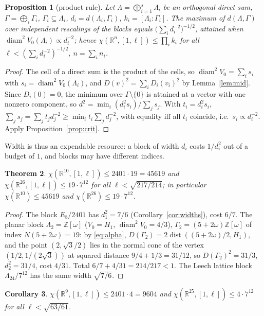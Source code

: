 \documentclass[10pt]{article}
\theoremstyle{plain}
\newtheorem{theorem}{Theorem}[section]
\newtheorem{proposition}[theorem]{Proposition}
\newtheorem{corollary}[theorem]{Corollary}
\theoremstyle{remark}
\newcommand{\R}{\mathbb{R}}
\newcommand{\Z}{\mathbb{Z}}
\newcommand{\diam}{\operatorname{diam}}
\newcommand{\dist}{\operatorname{dist}}
\begin{document}
\begin{proposition}[product rule]\label{prop:product}
Let $\Lambda=\bigoplus_{i=1}^{s}\Lambda_i$ be an orthogonal direct sum,
$\Gamma=\bigoplus_i\Gamma_i$, $\Gamma_i\subseteq\Lambda_i$,
$d_i=d(\Lambda_i,\Gamma_i)$, $k_i=[\Lambda_i:\Gamma_i]$. The maximum of
$d(\Lambda,\Gamma)$ over independent rescalings of the blocks equals
$\bigl(\sum_id_i^{-2}\bigr)^{-1/2}$, attained when
$\diam^2V_0(\Lambda_i)\propto d_i^{-2}$; hence
$\chi(\R^n,[1,\ell])\le\prod_ik_i$ for all $\ell<(\sum_id_i^{-2})^{-1/2}$,
$n=\sum_in_i$.
\end{proposition}

\begin{proof}
The cell of a direct sum is the product of the cells, so
$\diam^2V_0=\sum_is_i$ with $s_i=\diam^2V_0(\Lambda_i)$, and
$D(v)^2=\sum_iD_i(v_i)^2$ by Lemma~\ref{lem:mid}. Since $D_i(0)=0$, the
minimum over $\Gamma\setminus\{0\}$ is attained at a vector with one nonzero
component, so $d^2=\min_i(d_i^2s_i)/\sum_js_j$. With $t_i=d_i^2s_i$,
$\sum_js_j=\sum_jt_jd_j^{-2}\ge\min_it_i\sum_jd_j^{-2}$, with equality iff
all $t_i$ coincide, i.e.\ $s_i\propto d_i^{-2}$. Apply
Proposition~\ref{prop:crit}.
\end{proof}

Width is thus an expendable resource: a block of width $d_i$ costs
$1/d_i^2$ out of a budget of $1$, and blocks may have different indices.

\begin{theorem}\label{thm:45619}
$\chi(\R^{10},[1,\ell])\le2401\cdot19=45619$ and
$\chi(\R^{26},[1,\ell])\le19\cdot7^{12}$ for all $\ell<\sqrt{217/214}$; in
particular $\chi(\R^{10})\le45619$ and $\chi(\R^{26})\le19\cdot7^{12}$.
\end{theorem}

\begin{proof}
The block $E_8/2401$ has $d_1^2=7/6$ (Corollary~\ref{cor:widths}), cost
$6/7$. The planar block $\Lambda_2=\Z[\omega]$ ($V_0=H_1$, $\diam^2V_0=4/3$),
$\Gamma_2=(5+2\omega)\Z[\omega]$ of index $N(5+2\omega)=19$: by
\eqref{eq:alpha}, $D(\Gamma_2)=2\dist((5+2\omega)/2,H_1)$, and the point
$(2,\sqrt3/2)$ lies in the normal cone of the vertex $(1/2,1/(2\sqrt3))$ at
squared distance $9/4+1/3=31/12$, so $D(\Gamma_2)^2=31/3$, $d_2^2=31/4$, cost
$4/31$. Total $6/7+4/31=214/217<1$. The Leech lattice block
$\Lambda_{24}/7^{12}$ has the same width $\sqrt{7/6}$.
\end{proof}

\begin{corollary}\label{cor:9604}
$\chi(\R^9,[1,\ell])\le2401\cdot4=9604$ and
$\chi(\R^{25},[1,\ell])\le4\cdot7^{12}$ for all $\ell<\sqrt{63/61}$.
\end{corollary}
\end{document}
